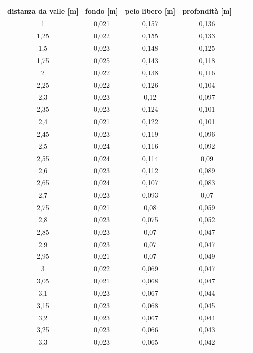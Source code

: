 \documentclass[12pt]{article} %
\begin{document}
\newpage
\vspace*{\fill}
\begin{table}[H]
\scriptsize\sffamily
\centering
\begin{tabular}{cccccc}
\hline
\textbf{distanza da valle {[}m{]}}  & \textbf{fondo {[}m{]}}              & \textbf{pelo libero {[}m{]}}        & \textbf{profondità {[}m{]}}         &  &  \\\hline
 1     &  0,021 &  0,157 &  0,136 &  &  \\
 1,25  &  0,022 &  0,155 &  0,133 &  &  \\
 1,5   &  0,023 &  0,148 &  0,125 &  &  \\
 1,75  &  0,025 &  0,143 &  0,118 &  &  \\
 2     &  0,022 &  0,138 &  0,116 &  &  \\
 2,25  &  0,022 &  0,126 &  0,104 &  &  \\
 2,3   &  0,023 &  0,12  &  0,097 &  &  \\
 2,35  &  0,023 &  0,124 &  0,101 &  &  \\
 2,4   &  0,021 &  0,122 &  0,101 &  &  \\
 2,45  &  0,023 &  0,119 &  0,096 &  &  \\
 2,5   &  0,024 &  0,116 &  0,092 &  &  \\
 2,55  &  0,024 &  0,114 &  0,09  &  &  \\
 2,6   &  0,023 &  0,112 &  0,089 &  &  \\
 2,65  &  0,024 &  0,107 &  0,083 &  &  \\
 2,7   &  0,023 &  0,093 &  0,07  &  &  \\
 2,75  &  0,021 &  0,08  &  0,059 &  &  \\
 2,8   &  0,023 &  0,075 &  0,052 &  &  \\
 2,85  &  0,023 &  0,07  &  0,047 &  &  \\
 2,9   &  0,023 &  0,07  &  0,047 &  &  \\
 2,95  &  0,021 &  0,07  &  0,049 &  &  \\
 3     &  0,022 &  0,069 &  0,047 &  &  \\
 3,05  &  0,021 &  0,068 &  0,047 &  &  \\
 3,1   &  0,023 &  0,067 &  0,044 &  &  \\
 3,15  &  0,023 &  0,068 &  0,045 &  &  \\
 3,2   &  0,023 &  0,067 &  0,044 &  &  \\
 3,25  &  0,023 &  0,066 &  0,043 &  &  \\
 3,3   &  0,023 &  0,065 &  0,042 &  &  \\

\end{tabular}
\end{table}
\end{document}
